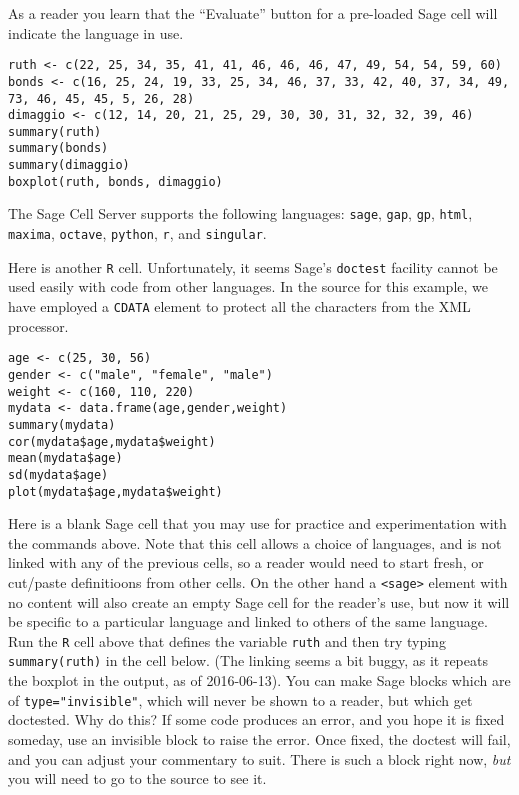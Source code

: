 \documentclass[10pt,]{article}
\theoremstyle{plain}
\theoremstyle{definition}
\theoremstyle{definition}
\theoremstyle{definition}
\theoremstyle{definition}
\theoremstyle{definition}
\theoremstyle{definition}
\numberwithin{equation}{section}
\begin{document}
\par
\hypertarget{p-20}{}%
As a reader you learn that the ``Evaluate'' button for a pre-loaded Sage cell will indicate the language in use.%
\begin{lstlisting}[style=sageinput]
ruth <- c(22, 25, 34, 35, 41, 41, 46, 46, 46, 47, 49, 54, 54, 59, 60)
bonds <- c(16, 25, 24, 19, 33, 25, 34, 46, 37, 33, 42, 40, 37, 34, 49, 73, 46, 45, 45, 5, 26, 28)
dimaggio <- c(12, 14, 20, 21, 25, 29, 30, 30, 31, 32, 32, 39, 46)
summary(ruth)
summary(bonds)
summary(dimaggio)
boxplot(ruth, bonds, dimaggio)
\end{lstlisting}
\hypertarget{p-21}{}%
The Sage Cell Server supports the following languages:  \lstinline?sage?, \lstinline?gap?, \lstinline?gp?, \lstinline?html?, \lstinline?maxima?, \lstinline?octave?, \lstinline?python?, \lstinline?r?, and \lstinline?singular?.%
\par
\hypertarget{p-22}{}%
Here is another \lstinline?R? cell.  Unfortunately, it seems Sage's \lstinline?doctest? facility cannot be used easily with code from other languages.  In the source for this example, we have employed a \lstinline?CDATA? element to protect all the characters from the XML processor.%
\begin{lstlisting}[style=sageinput]
age <- c(25, 30, 56)
gender <- c("male", "female", "male")
weight <- c(160, 110, 220)
mydata <- data.frame(age,gender,weight)
summary(mydata)
cor(mydata$age,mydata$weight)
mean(mydata$age)
sd(mydata$age)
plot(mydata$age,mydata$weight)
\end{lstlisting}
\hypertarget{p-23}{}%
Here is a blank Sage cell that you may use for practice and experimentation with the commands above.  Note that this cell allows a choice of languages, and is not linked with any of the previous cells, so a reader would need to start fresh, or cut/paste definitioons from other cells.%
\hypertarget{p-24}{}%
On the other hand a \lstinline?<sage>? element with no content will also create an empty Sage cell for the reader's use, but now it will be specific to a particular language and linked to others of the same language.  Run the \lstinline?R? cell above that defines the variable \lstinline?ruth? and then try typing \lstinline?summary(ruth)? in the cell below.  (The linking seems a bit buggy, as it repeats the boxplot in the output, as of 2016-06-13).%
\hypertarget{p-25}{}%
You can make Sage blocks which are of \lstinline?type="invisible"?, which will never be shown to a reader, but which get doctested.  Why do this?  If some code produces an error, and you hope it is fixed someday, use an invisible block to raise the error.  Once fixed, the doctest will fail, and you can adjust your commentary to suit.  There is such a block right now, \emph{but} you will need to go to the source to see it.%
\end{document}
